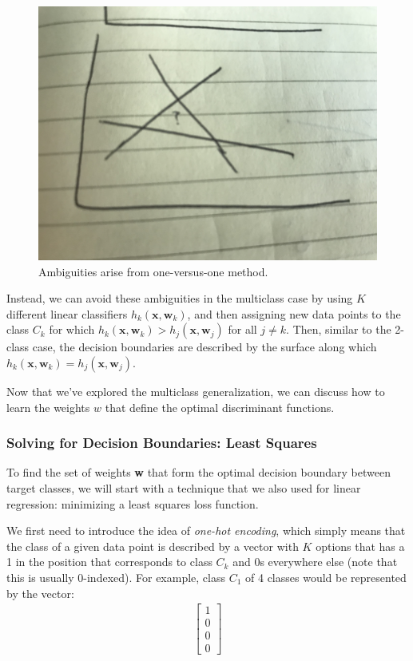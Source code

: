 \begin{figure}
    \centering
    \includegraphics[width=0.5\paperwidth]{../Classification/fig/one_vs_one_ambig.jpg}
    \caption{Ambiguities arise from one-versus-one method.}
    \label{fig:one-vs-one-ambig}
\end{figure}

Instead, we can avoid these ambiguities in the multiclass case by using $K$ different linear classifiers $h_{k}(\textbf{x}, \textbf{w}_{k})$, and then assigning new data points to the class $C_{k}$ for which $h_{k}(\textbf{x}, \textbf{w}_{k}) > h_{j}(\textbf{x}, \textbf{w}_{j})$ for all $j \neq k$. Then, similar to the 2-class case, the decision boundaries are described by the surface along which $h_{k}(\textbf{x}, \textbf{w}_{k}) = h_{j}(\textbf{x}, \textbf{w}_{j})$.

Now that we've explored the multiclass generalization, we can discuss how to learn the weights $w$ that define the optimal discriminant functions.

\subsubsection{Solving for Decision Boundaries: Least Squares}
To find the set of weights \textbf{w} that form the optimal decision boundary between target classes, we will start with a technique that we also used for linear regression: minimizing a least squares loss function.

We first need to introduce the idea of \textit{one-hot encoding}, which simply means that the class of a given data point is described by a vector with $K$ options that has a 1 in the position that corresponds to class $C_{k}$ and 0s everywhere else (note that this is usually 0-indexed). For example, class $C_{1}$ of 4 classes would be represented by the vector:
\begin{align}
    \begin{bmatrix}
    	1 \\
        0 \\
        0 \\
        0
    \end{bmatrix}
\end{align}


